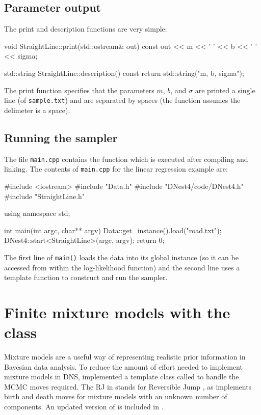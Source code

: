 \documentclass[article, nojss]{jss}
\begin{document}
\subsection{Parameter output}
The print and description functions are very simple:
\begin{CodeChunk}
\begin{CodeInput}
void StraightLine::print(std::ostream& out) const
{
    out << m << ' ' << b << ' ' << sigma;
}

std::string StraightLine::description() const
{
    return std::string("m, b, sigma");
}
\end{CodeInput}
\end{CodeChunk}
The print function specifies that the parameters
$m$, $b$, and $\sigma$ are printed a single line
(of {\tt sample.txt}) and are separated by spaces (the
 function assumes the delimeter is a space).

\subsection{Running the sampler}
The file {\tt main.cpp} contains the  function which
is executed after compiling and linking. The contents of {\tt main.cpp}
for the linear regression example are:

\begin{CodeChunk}
\begin{CodeInput}
#include <iostream>
#include "Data.h"
#include "DNest4/code/DNest4.h"
#include "StraightLine.h"

using namespace std;

int main(int argc, char** argv)
{
    Data::get_instance().load("road.txt");
    DNest4::start<StraightLine>(argc, argv);
    return 0;
}
\end{CodeInput}
\end{CodeChunk}


The first line of {\tt main()} loads the data into its global instance
(so it can be accessed from within the log-likelihood function)
and the second line uses a  template function to construct
and run the sampler.

\section[Finite mixture models with the RJObject class]{Finite mixture models with the  class}
Mixture models are a useful way of representing realistic prior information
in Bayesian data analysis. To reduce the amount of effort needed to
implement mixture models in DNS, \citet{brewer2014inference} implemented
a template class called  to handle the MCMC moves
required. The RJ in  stands for Reversible Jump
\citep{green1995reversible}, as
 implements birth and death moves for mixture
models with an unknown number of components. An updated version of
 is included in .
\end{document}
